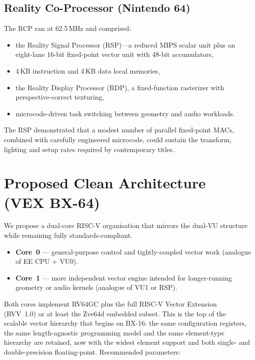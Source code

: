 \documentclass[11pt,a4paper]{article}
\begin{document}
\subsection{Reality Co-Processor (Nintendo 64)}

The RCP ran at 62.5\,MHz and comprised:
\begin{itemize}[leftmargin=1.5em]
  \item the Reality Signal Processor (RSP)---a reduced MIPS scalar unit plus an eight-lane 16-bit fixed-point vector unit with 48-bit accumulators,
  \item 4\,KB instruction and 4\,KB data local memories,
  \item the Reality Display Processor (RDP), a fixed-function rasterizer with perspective-correct texturing,
  \item microcode-driven task switching between geometry and audio workloads.
\end{itemize}
The RSP demonstrated that a modest number of parallel fixed-point MACs, combined with carefully engineered microcode, could sustain the transform, lighting and setup rates required by contemporary titles.

\section{Proposed Clean Architecture (VEX BX-64)}

We propose a dual-core RISC-V organisation that mirrors the dual-VU structure while remaining fully standards-compliant.

\begin{itemize}[leftmargin=1.5em]
  \item \textbf{Core~0} --- general-purpose control and tightly-coupled vector work (analogue of EE CPU + VU0).  
  \item \textbf{Core~1} --- more independent vector engine intended for longer-running geometry or audio kernels (analogue of VU1 or RSP).  
\end{itemize}

Both cores implement RV64GC plus the full RISC-V Vector Extension (RVV~1.0) or at least the Zve64d embedded subset. This is the top of the scalable vector hierarchy that begins on BX-16: the same configuration registers, the same length-agnostic programming model and the same element-type hierarchy are retained, now with the widest element support and both single- and double-precision floating-point. Recommended parameters:
\end{document}
